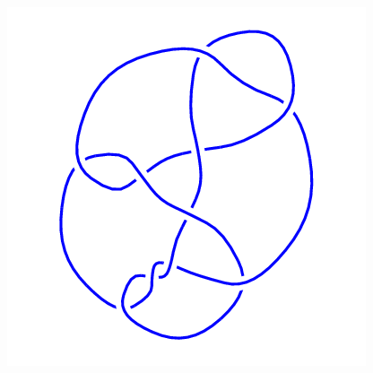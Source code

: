 \begin{figure}[H]
\begin{minipage}[b]{.18\linewidth}
    \end{minipage}
    \begin{minipage}[b]{.18\linewidth}
        \centering
        \includegraphics[width=\linewidth]{../data/10_131.png}
    \end{minipage}
\end{figure}
